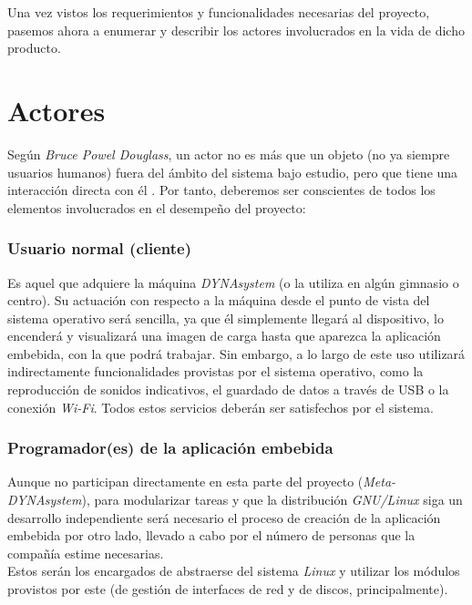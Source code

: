 Una vez vistos los requerimientos y funcionalidades necesarias del proyecto, pasemos ahora a enumerar y describir los actores involucrados en la vida de dicho producto.

\section{Actores}

Según \textit{Bruce Powel Douglass}, un actor no es más que un objeto (no ya siempre usuarios humanos) fuera del ámbito del sistema bajo estudio, pero que tiene una interacción directa con él \cite{real-time-uml-use-cases}. Por tanto, deberemos ser conscientes de todos los elementos involucrados en el desempeño del proyecto:

\subsubsection{Usuario normal (cliente)}

Es aquel que adquiere la máquina \textit{DYNAsystem} (o la utiliza en algún gimnasio o centro). Su actuación con respecto a la máquina desde el punto de vista del sistema operativo será sencilla, ya que él simplemente llegará al dispositivo, lo encenderá y visualizará una imagen de carga hasta que aparezca la aplicación embebida, con la que podrá trabajar. Sin embargo, a lo largo de este uso utilizará indirectamente funcionalidades provistas por el sistema operativo, como la reproducción de sonidos indicativos, el guardado de datos a través de USB o la conexión \textit{Wi-Fi}. Todos estos servicios deberán ser satisfechos por el sistema.

\subsubsection{Programador(es) de la aplicación embebida}

Aunque no participan directamente en esta parte del proyecto (\textit{Meta-DYNAsystem}), para modularizar tareas y que la distribución \textit{GNU/Linux} siga un desarrollo independiente será necesario el proceso de creación de la aplicación embebida por otro lado, llevado a cabo por el número de personas que la compañía estime necesarias.\\

Estos serán los encargados de abstraerse del sistema \textit{Linux} y utilizar los módulos provistos por este (de gestión de interfaces de red y de discos, principalmente).

